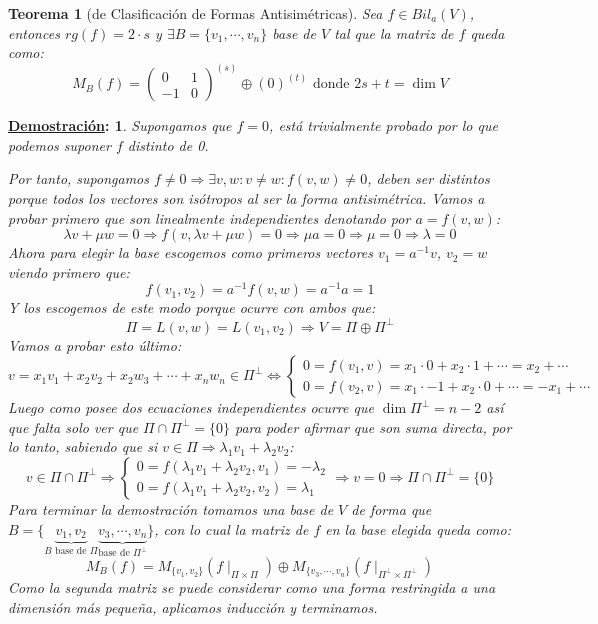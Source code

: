 \documentclass[10pt,a4paper,openright]{book}
\theoremstyle{break}
\newtheorem*{theo}{Teorema}
\newtheorem*{demo}{\underline{Demostración}:}
\begin{document}
\begin{theo}[de Clasificación de Formas Antisimétricas]
Sea $f\in Bil_a(V)$, entonces $rg(f) = 2\cdot s$ y $\exists B =\{v_1, \cdots, v_n\}$ base de $V$ tal que la matriz de $f$ queda como:
$$M_B(f) = \begin{pmatrix} 0 & 1 \\ -1 & 0 \end{pmatrix}^{(s)}\oplus (0)^{(t)}\mbox{ donde }2s+t=\dim V$$
\end{theo}

\begin{demo}
Supongamos que $f=0$, está trivialmente probado por lo que podemos suponer $f$ distinto de 0.

Por tanto, supongamos $f\neq 0\Rightarrow \exists v,w: v\neq w: f(v,w)\neq 0$, deben ser distintos porque todos los vectores son isótropos al ser la forma antisimétrica. Vamos a probar primero que son linealmente independientes denotando por $a=f(v,w)$:
$$\lambda v +\mu w = 0\Rightarrow f(v, \lambda v+\mu w)=0 \Rightarrow \mu a = 0\Rightarrow \mu = 0\Rightarrow \lambda =0$$
Ahora para elegir la base escogemos como primeros vectores $v_1 = a^{-1}v$, $v_2=w$ viendo primero que:
$$f(v_1,v_2)=a^{-1}f(v,w)= a^{-1}a = 1$$
Y los escogemos de este modo porque ocurre con ambos que:
$$\Pi = L(v,w)=L(v_1, v_2)\Rightarrow V = \Pi \oplus \Pi^\perp$$
Vamos a probar esto último:
$$v =x_1v_1+x_2v_2+ x_2w_3+\cdots + x_nw_n \in \Pi^\perp\Leftrightarrow\begin{cases}0 = f(v_1, v)= x_1\cdot 0 +x_2\cdot 1 + \cdots = x_2 +\cdots \\ 0 = f(v_2, v) = x_1\cdot -1 + x_2\cdot 0+ \cdots = -x_1+\cdots  \end{cases}$$
Luego como posee dos ecuaciones independientes ocurre que $\dim \Pi^\perp = n-2$ así que falta solo ver que $\Pi \cap \Pi^\perp = \{0\}$ para poder afirmar que son suma directa, por lo tanto, sabiendo que si $v\in \Pi\Rightarrow \lambda_1v_1+\lambda_2v_2$:
$$v\in \Pi\cap \Pi^\perp\Rightarrow \begin{cases}0 = f(\lambda_1v_1+\lambda_2v_2, v_1) = -\lambda_2 \\ 0 = f(\lambda_1v_1+\lambda_2v_2, v_2)=\lambda_1\end{cases}\Rightarrow v=0\Rightarrow \Pi\cap \Pi^\perp = \{0\}$$
Para terminar la demostración tomamos una base de $V$ de forma que $B=\{\underbrace{v_1,v_2}_{B\mbox{ base de }\Pi}\underbrace{v_3, \cdots , v_n}_{ \mbox{base de }\Pi^\perp}\}$, con lo cual la matriz de $f$ en la base elegida queda como:
$$M_B(f)=M_{\{v_1,v_2\}}(f\mid_{\Pi\times \Pi})\oplus M_{\{v_3, \cdots, v_n\}}(f\mid_{\Pi^\perp \times \Pi^\perp})$$
Como la segunda matriz se puede considerar como una forma restringida a una dimensión más pequeña, aplicamos inducción y terminamos.
\end{demo}
\end{document}
